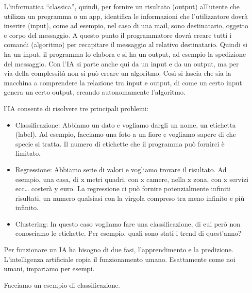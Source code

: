 \documentclass[12pt]{book} %
\begin{document}
L'informatica “classica”, quindi, per fornire un risultato (output) all'utente
che utilizza un programma o un app, identifica le informazioni che l'utilizzatore dovrà inserire
(input), come ad esempio, nel caso di una mail, sono destinatario, oggetto e corpo del messaggio. A questo punto il
programmatore dovrà creare tutti i comandi (algoritmo) per recapitare il messaggio al relativo destinatario. Quindi si
ha un input, il programma lo elabora e si ha un output, ad esempio la spedizione del messaggio. Con
l'IA si parte anche qui da un input e da un output, ma per via della complessità non si può creare
un algoritmo. Così si lascia che sia la macchina a comprendere la relazione tra input e output, di come un certo input
genera un certo output, creando autonomamente l'algoritmo.


\bigskip

l'IA consente di risolvere tre principali problemi: 

\begin{itemize}
\item Classificazione: Abbiamo un dato e vogliamo dargli un nome, un etichetta (label). Ad esempio, facciamo una foto a
un fiore e vogliamo sapere di che specie si tratta. Il numero di etichette che il programma può fornirci è limitato.
\item Regressione: Abbiamo serie di valori e vogliamo trovare il risultato. Ad esempio, una casa, di x metri quadri, con
x camere, nella x zona, con x servizi ecc… costerà y euro. La regressione ci può fornire potenzialmente infiniti
risultati, un numero qualsiasi con la virgola compreso tra meno infinito e più infinito.
\item Clustering: In questo caso vogliamo fare una classificazione, di cui però non conosciamo le etichette. Per
esempio, quali sono stati i trend di quest'anno?
\end{itemize}

\bigskip

Per funzionare un IA ha bisogno di due fasi, l'apprendimento e la predizione.
L'intelligenza artificiale copia il funzionamento umano. Esattamente come noi umani, impariamo per
esempi.

Facciamo un esempio di classificazione.
\end{document}
